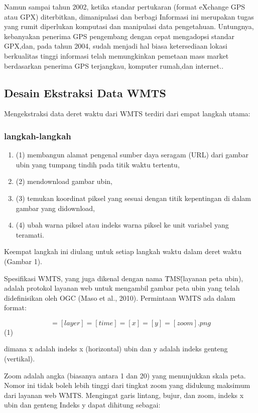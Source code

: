 Namun sampai tahun 2002, ketika standar pertukaran (format eXchange GPS atau GPX) diterbitkan, dimanipulasi dan berbagi Informasi ini
merupakan tugas yang rumit diperlukan komputasi dan manipulasi data pengetahuan. Untungnya, kebanyakan penerima GPS pengembang dengan
cepat mengadopsi standar GPX,dan, pada tahun 2004, sudah menjadi hal biasa ketersediaan lokasi berkualitas tinggi informasi telah
memungkinkan pemetaan mass market berdasarkan penerima GPS terjangkau, komputer rumah,dan internet.\cite{haklay2008openstreetmap}. 


\subsection{Desain Ekstraksi Data WMTS}
Mengekstraksi data deret waktu dari WMTS terdiri dari empat langkah utama:
\subsubsection{langkah-langkah}
\begin{enumerate}
	\item (1) membangun alamat pengenal sumber daya seragam (URL) dari gambar ubin yang tumpang tindih pada titik waktu tertentu, 
	\item (2) mendownload gambar ubin, 
	\item (3) temukan koordinat piksel yang sesuai dengan titik kepentingan di dalam gambar yang didownload,
	\item (4) ubah warna piksel atau indeks warna piksel ke unit variabel yang teramati.
\end{enumerate}
Keempat langkah ini diulang untuk setiap langkah waktu dalam deret waktu (Gambar 1).

Spesifikasi WMTS, yang juga dikenal dengan nama \"TMS\" (layanan peta ubin), adalah protokol layanan web untuk mengambil gambar peta ubin yang telah
didefinisikan oleh OGC (Maso et al., 2010). Permintaan WMTS ada dalam format:

\begin{equation}
	    [server]=[layer]=[time]=[x]=[y]=[zoom].png 
\end{equation}
(1)

dimana x adalah indeks x (horizontal) ubin dan y adalah indeks genteng (vertikal).

Zoom adalah angka (biasanya antara 1 dan 20) yang menunjukkan skala peta. Nomor ini tidak boleh lebih tinggi dari tingkat zoom yang 
didukung maksimum dari layanan web WMTS. Mengingat garis lintang, bujur, dan zoom, indeks x ubin dan genteng
Indeks y dapat dihitung sebagai:

